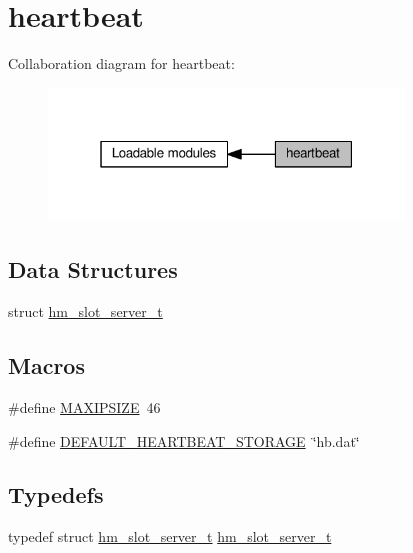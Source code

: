 \hypertarget{group__HEARTBEAT}{}\section{heartbeat}
\label{group__HEARTBEAT}
Collaboration diagram for heartbeat\+:
\nopagebreak
\begin{figure}[H]
\begin{center}
\leavevmode
\includegraphics[width=268pt]{group__HEARTBEAT}
\end{center}
\end{figure}
\subsection*{Data Structures}
\begin{DoxyCompactItemize}
\item 
struct \hyperlink{structhm__slot__server__t}{hm\+\_\+slot\+\_\+server\+\_\+t}
\end{DoxyCompactItemize}
\subsection*{Macros}
\begin{DoxyCompactItemize}
\item 
\#define \hyperlink{group__HEARTBEAT_gae192505cd9047f7280229eac4742b18c}{M\+A\+X\+I\+P\+S\+I\+ZE}~46
\item 
\#define \hyperlink{group__HEARTBEAT_gad816f793fb58a22f0fddbdaba6b8f0a5}{D\+E\+F\+A\+U\+L\+T\+\_\+\+H\+E\+A\+R\+T\+B\+E\+A\+T\+\_\+\+S\+T\+O\+R\+A\+GE}~\char`\"{}hb.\+dat\char`\"{}
\end{DoxyCompactItemize}
\subsection*{Typedefs}
\begin{DoxyCompactItemize}
\item 
typedef struct \hyperlink{structhm__slot__server__t}{hm\+\_\+slot\+\_\+server\+\_\+t} \hyperlink{group__HEARTBEAT_ga1eb94459006285bb54775e624528ab1a}{hm\+\_\+slot\+\_\+server\+\_\+t}
\end{DoxyCompactItemize}


